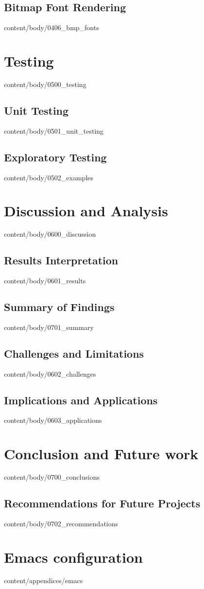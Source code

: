 \documentclass[english, tfg, loc, lof, firstnumbered, epsbased]{tfgtfmthesisuam}
\begin{document}
  \section{Bitmap Font Rendering}{content/body/0406_bmp_fonts}                      %

\chapter{Testing}{content/body/0500_testing}                                        %
  \section{Unit Testing}{content/body/0501_unit_testing}                            %
  \section{Exploratory Testing}{content/body/0502_examples}                         %

\chapter{Discussion and Analysis}{content/body/0600_discussion}                     %
  \section{Results Interpretation}{content/body/0601_results}                       %
  \section{Summary of Findings}{content/body/0701_summary}                          %
  \section{Challenges and Limitations}{content/body/0602_challenges}                %
  \section{Implications and Applications}{content/body/0603_applications}           %
  
\chapter{Conclusion and Future work}{content/body/0700_conclusions}                 %
  \section{Recommendations for Future Projects}{content/body/0702_recommendations}  %

\appendix

\chapter{Emacs configuration}{content/appendices/emacs}
\end{document}
